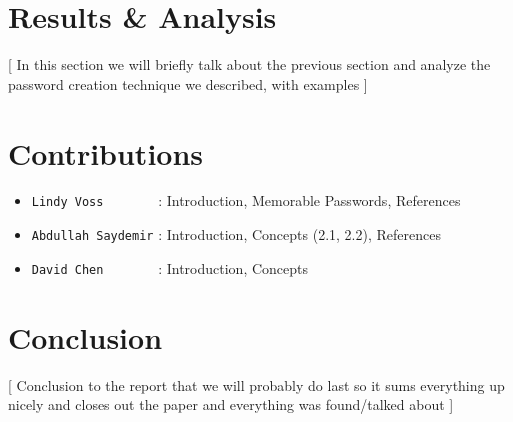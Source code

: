 \documentclass[acmsmall,nonacm]{acmart}
\begin{document}
\section{Results \& Analysis}
\textcolor{beaver}{[ In this section we will briefly talk about the previous section and analyze the password creation technique we described, with examples ]} 

\section{Contributions}
\begin{itemize}
\item{\verb|Lindy Voss       |} : Introduction, Memorable Passwords, References
\item{\verb|Abdullah Saydemir|} : Introduction, Concepts (2.1, 2.2), References
\item{\verb|David Chen       |} : Introduction, Concepts
\end{itemize}


\section{Conclusion}
\textcolor{beaver}{[ Conclusion to the report that we will probably do last so it sums everything up nicely and closes out the paper and everything was found/talked about ]}



\appendix
\end{document}
